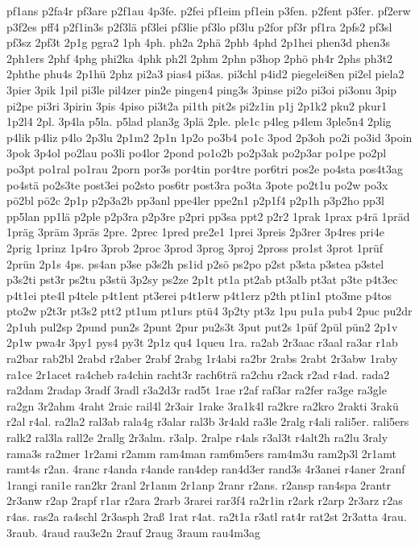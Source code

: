 {pf1ans
p2fa4r
pf3are
p2f1au
4p3fe.
p2fei
pf1eim
pf1ein
p3fen.
p2fent
p3fer.
pf2erw
p3f2es
pff4
p2f1in3s
p2f3lä
pf3lei
pf3lie
pf3lo
pf3lu
p2for
pf3r
pf1ra
2pfs2
pf3sl
pf3sz
2pf3t
2p1g
pgra2
1ph
4ph.
ph2a
2phä
2phb
4phd
2p1hei
phen3d
phen3s
2ph1ers
2phf
4phg
phi2ka
4phk
ph2l
2phm
2phn
p3hop
2phö
ph4r
2phs
ph3t2
2phthe
phu4s
2p1hü
2phz
pi2a3
pias4
pi3as.
pi3chl
p4id2
piegelei8en
pi2el
piela2
3pier
3pik
1pil
pi3le
pil4zer
pin2e
pingen4
ping3s
3pinse
pi2o
pi3oi
pi3onu
3pip
pi2pe
pi3ri
3pirin
3pis
4piso
pi3t2a
pi1th
pit2s
pi2z1in
p1j
2p1k2
pku2
pkur1
1p2l4
2pl.
3p4la
p5la.
p5lad
plan3g
3plä
2ple.
ple1c
p4leg
p4lem
3ple5n4
2plig
p4lik
p4liz
p4lo
2p3lu
2p1m2
2p1n
1p2o
po3b4
po1c
3pod
2p3oh
po2i
po3id
3poin
3pok
3p4ol
po2lau
po3li
po4lor
2pond
po1o2b
po2p3ak
po2p3ar
po1pe
po2pl
po3pt
po1ral
po1rau
2porn
por3s
por4tin
por4tre
por6tri
pos2e
po4sta
pos4t3ag
po4stä
po2s3te
post3ei
po2sto
pos6tr
post3ra
po3ta
3pote
po2t1u
po2w
po3x
pö2bl
pö2c
2p1p
p2p3a2b
pp3anl
ppe4ler
ppe2n1
p2p1f4
p2p1h
p3p2ho
pp3l
pp5lan
pp1lä
p2ple
p2p3ra
p2p3re
p2pri
pp3sa
ppt2
p2r2
1prak
1prax
p4rä
1präd
1präg
3präm
3präs
2pre.
2prec
1pred
pre2e1
1prei
3preis
2p3rer
3p4res
pri4e
2prig
1prinz
1p4ro
3prob
2proc
3prod
3prog
3proj
2pross
pro1st
3prot
1prüf
2prün
2p1s
4ps.
ps4an
p3se
p3s2h
ps1id
p2sö
ps2po
p2st
p3sta
p3stea
p3stel
p3s2ti
pst3r
ps2tu
p3stü
3p2sy
ps2ze
2p1t
pt1a
pt2ab
pt3alb
pt3at
p3te
p4t3ec
p4t1ei
pte4l
p4tele
p4t1ent
pt3erei
p4t1erw
p4t1erz
p2th
pt1in1
pto3me
p4tos
pto2w
p2t3r
pt3s2
ptt2
pt1um
pt1urs
ptü4
3p2ty
pt3z
1pu
pu1a
pub4
2puc
pu2dr
2p1uh
pul2sp
2pund
pun2s
2punt
2pur
pu2s3t
3put
put2s
1püf
2pül
pün2
2p1v
2p1w
pwa4r
3py1
pys4
py3t
2p1z
qu4
1queu
1ra.
ra2ab
2r3aac
r3aal
ra3ar
r1ab
ra2bar
rab2bl
2rabd
r2aber
2rabf
2rabg
1r4abi
ra2br
2rabs
2rabt
2r3abw
1raby
ra1ce
2r1acet
ra4cheb
ra4chin
racht3r
rach6trä
ra2chu
r2ack
r2ad
r4ad.
rada2
ra2dam
2radap
3radf
3radl
r3a2d3r
rad5t
1rae
r2af
raf3ar
ra2fer
ra3ge
ra3gle
ra2gn
3r2ahm
4raht
2raic
rail4l
2r3air
1rake
3ra1k4l
ra2kre
ra2kro
2rakti
3rakü
r2al
r4al.
ra2la2
ral3ab
rala4g
r3alar
ral3b
3r4ald
ra3le
2ralg
r4ali
rali5er.
rali5ers
ralk2
ral3la
rall2e
2rallg
2r3alm.
r3alp.
2ralpe
r4als
r3al3t
r4alt2h
ra2lu
3raly
rama3s
ra2mer
1r2ami
r2amm
ram4man
ram6m5ers
ram4m3u
ram2p3l
2r1amt
ramt4s
r2an.
4ranc
r4anda
r4ande
ran4dep
ran4d3er
rand3s
4r3anei
r4aner
2ranf
1rangi
rani1e
ran2kr
2ranl
2r1anm
2r1anp
2ranr
r2ans.
r2ansp
ran4spa
2rantr
2r3anw
r2ap
2rapf
r1ar
r2ara
2rarb
3rarei
rar3f4
ra2r1in
r2ark
r2arp
2r3arz
r2as
r4as.
ras2a
ra4schl
2r3asph
2raß
1rat
r4at.
ra2t1a
r3atl
rat4r
rat2st
2r3atta
4rau.
3raub.
4raud
rau3e2n
2rauf
2raug
3raum
rau4m3ag
}
